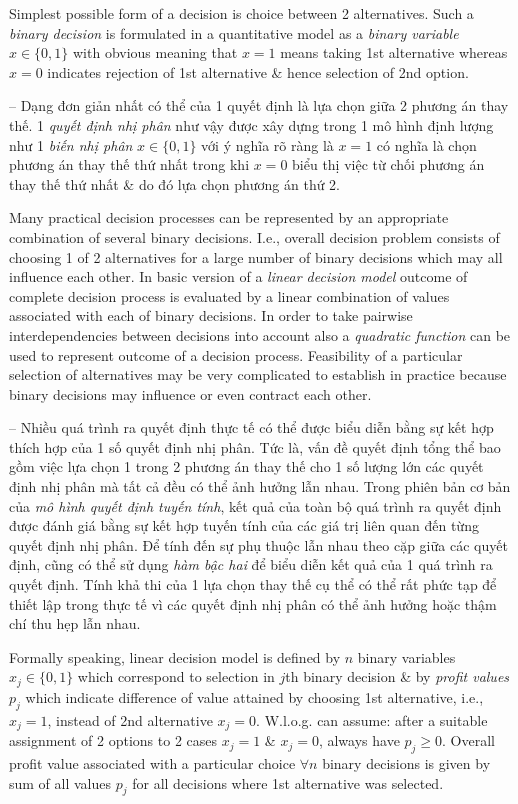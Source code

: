 \documentclass{article}
\begin{document}
\begin{itemize}
\begin{itemize}
        Simplest possible form of a decision is choice between 2 alternatives. Such a {\it binary decision} is formulated in a quantitative model as a {\it binary variable} $x\in\{0,1\}$ with obvious meaning that $x = 1$ means taking 1st alternative whereas $x = 0$ indicates rejection of 1st alternative \& hence selection of 2nd option.

        -- Dạng đơn giản nhất có thể của 1 quyết định là lựa chọn giữa 2 phương án thay thế. 1 {\it quyết định nhị phân} như vậy được xây dựng trong 1 mô hình định lượng như 1 {\it biến nhị phân} $x\in\{0,1\}$ với ý nghĩa rõ ràng là $x = 1$ có nghĩa là chọn phương án thay thế thứ nhất trong khi $x = 0$ biểu thị việc từ chối phương án thay thế thứ nhất \& do đó lựa chọn phương án thứ 2.

        Many practical decision processes can be represented by an appropriate combination of several binary decisions. I.e., overall decision problem consists of choosing 1 of 2 alternatives for a large number of binary decisions which may all influence each other. In basic version of a {\it linear decision model} outcome of complete decision process is evaluated by a linear combination of values associated with each of binary decisions. In order to take pairwise interdependencies between decisions into account also a {\it quadratic function} can be used to represent outcome of a decision process. Feasibility of a particular selection of alternatives may be very complicated to establish in practice because binary decisions may influence or even contract each other.

        -- Nhiều quá trình ra quyết định thực tế có thể được biểu diễn bằng sự kết hợp thích hợp của 1 số quyết định nhị phân. Tức là, vấn đề quyết định tổng thể bao gồm việc lựa chọn 1 trong 2 phương án thay thế cho 1 số lượng lớn các quyết định nhị phân mà tất cả đều có thể ảnh hưởng lẫn nhau. Trong phiên bản cơ bản của {\it mô hình quyết định tuyến tính}, kết quả của toàn bộ quá trình ra quyết định được đánh giá bằng sự kết hợp tuyến tính của các giá trị liên quan đến từng quyết định nhị phân. Để tính đến sự phụ thuộc lẫn nhau theo cặp giữa các quyết định, cũng có thể sử dụng {\it hàm bậc hai} để biểu diễn kết quả của 1 quá trình ra quyết định. Tính khả thi của 1 lựa chọn thay thế cụ thể có thể rất phức tạp để thiết lập trong thực tế vì các quyết định nhị phân có thể ảnh hưởng hoặc thậm chí thu hẹp lẫn nhau.

        Formally speaking, linear decision model is defined by $n$ binary variables $x_j\in\{0,1\}$ which correspond to selection in $j$th binary decision \& by {\it profit values} $p_j$ which indicate difference of value attained by choosing 1st alternative, i.e., $x_j = 1$, instead of 2nd alternative $x_j = 0$. W.l.o.g. can assume: after a suitable assignment of 2 options to 2 cases $x_j = 1$ \& $x_j = 0$, always have $p_j\ge0$. Overall profit value associated with a particular  choice $\forall n$ binary decisions is given by sum of all values $p_j$ for all decisions where 1st alternative was selected.


\end{itemize}
\end{itemize}
\end{document}
